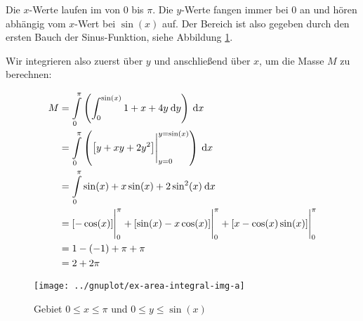 \item Die $x$-Werte laufen im von $0$ bis $\pi$. Die $y$-Werte fangen immer bei $0$ an und hören abhängig vom $x$-Wert bei $\sin(x)$ auf. Der Bereich ist also gegeben durch den ersten Bauch der Sinus-Funktion, siehe Abbildung \ref{fig:Area}.

Wir integrieren also zuerst über $y$ und anschließend über $x$, um die Masse $M$ zu berechnen:

\begin{alignat*}{1}
	M  &= \int\limits_0^\pi \left( \int_0^{\sin(x)} 1+x+4y \:\mathrm{d}{y} \right) \:\mathrm{d}{x} \\
	   &= \int\limits_0^\pi \left( \left[ y + xy + 2y^2 \right]\Biggr|_{y=0}^{y=\sin(x)} \right) \:\mathrm{d}{x} \\
	   &= \int\limits_0^\pi  \sin(x)+x\sin(x)+2\sin^2(x) \:\mathrm{d}{x} \\
	   &= [-\cos(x)]\Biggr|_{0}^{\pi} + [\sin(x)-x\cos(x)]\Biggr|_{0}^{\pi} + [x-\cos(x)\sin(x)]\Biggr|_{0}^{\pi} \\
	   &= 1 - (-1) + \pi + \pi \\
	   &= 2 + 2\pi
\end{alignat*}

\begin{figure}
	\centering
	\texttt{[image: ../gnuplot/ex-area-integral-img-a]}
	\caption{Gebiet $0 \le x \le \pi$ und $0 \le y \le \sin(x)$}
	\label{fig:Area}
\end{figure}
